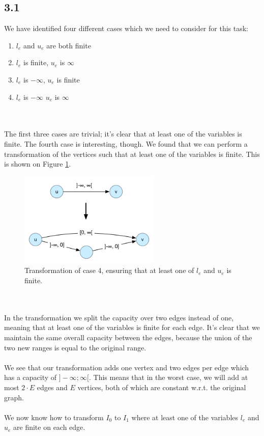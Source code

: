 \documentclass[12pt]{article}
\begin{document}
\subsection*{3.1}
We have identified four different cases which we need to consider for this task:
\begin{enumerate}
    \item $l_e$ and $u_e$ are both finite
    \item $l_e$ is finite, $u_e$ is $\infty$
    \item $l_e$ is $-\infty$, $u_e$ is finite
    \item $l_e$ is $-\infty$ $u_e$ is $\infty$
\end{enumerate}~\\
\\
The first three cases are trivial; it's clear that at least one of the variables is finite. The fourth case is interesting, though. We found that we can perform a transformation of the vertices such that at least one of the variables is finite. This is shown on Figure \ref{fig:e3_1}.

\begin{figure}[h]
  \centering
    \includegraphics[width=0.6\textwidth]{figures/e3_1}
  \caption{Transformation of case 4, ensuring that at least one of $l_e$ and $u_e$ is finite.}
    \label{fig:e3_1}
\end{figure}~\\
\\
In the transformation we split the capacity over two edges instead of one, meaning that at least one of the variables is finite for each edge. It's clear that we maintain the same overall capacity between the edges, because the union of the two new ranges is equal to the original range.\\
\\
We see that our transformation adds one vertex and two edges per edge which has a capacity of $]-\infty;\infty[$. This means that in the worst case, we will add at most $2\cdot E$ edges and $E$ vertices, both of which are constant w.r.t. the original graph.\\
\\
We now know how to transform $I_0$ to $I_1$ where at least one of the variables $l_e$ and $u_e$ are finite on each edge.
\end{document}
